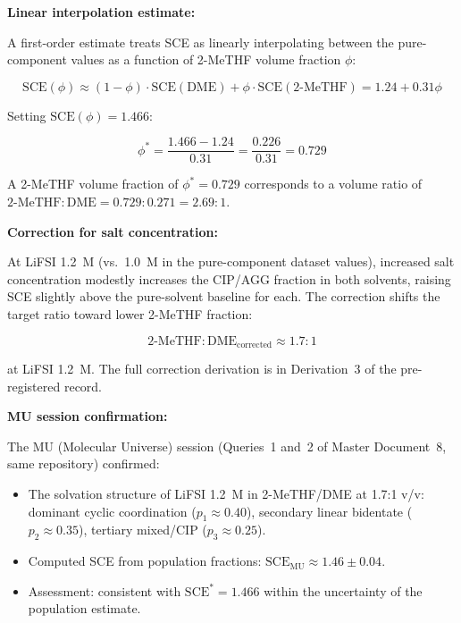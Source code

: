 \documentclass[11pt]{article}
\theoremstyle{plain}
\theoremstyle{definition}
\theoremstyle{remark}
\begin{document}
\textbf{Linear interpolation estimate:}

A first-order estimate treats SCE as linearly interpolating between
the pure-component values as a function of 2-MeTHF volume fraction
$\phi$:

\begin{equation}
  \mathrm{SCE}(\phi) \approx
  (1 - \phi) \cdot \mathrm{SCE}(\mathrm{DME}) +
  \phi \cdot \mathrm{SCE}(\mathrm{2\text{-}MeTHF})
  = 1.24 + 0.31\phi
  \label{eq:SCE_interpolation}
\end{equation}

Setting $\mathrm{SCE}(\phi) = 1.466$:

\begin{equation}
  \phi^{*} = \frac{1.466 - 1.24}{0.31} = \frac{0.226}{0.31} = 0.729
  \label{eq:phi_star}
\end{equation}

A 2-MeTHF volume fraction of $\phi^{*} = 0.729$ corresponds to a
volume ratio of $\mathrm{2\text{-}MeTHF}:\mathrm{DME} = 0.729:0.271
= 2.69:1$.

\textbf{Correction for salt concentration:}

At LiFSI 1.2~M (vs.\ 1.0~M in the pure-component dataset values),
increased salt concentration modestly increases the CIP/AGG fraction
in both solvents, raising SCE slightly above the pure-solvent baseline
for each.  The correction shifts the target ratio toward lower
2-MeTHF fraction:

\begin{equation}
  \mathrm{2\text{-}MeTHF}:\mathrm{DME}_{\mathrm{corrected}} \approx 1.7:1
  \label{eq:corrected_ratio}
\end{equation}

at LiFSI 1.2~M.  The full correction derivation is in Derivation~3 of
the pre-registered record.

\textbf{MU session confirmation:}

The MU (Molecular Universe) session (Queries~1 and~2 of Master
Document~8, same repository) confirmed:
\begin{itemize}[leftmargin=2em]
  \item The solvation structure of LiFSI 1.2~M in 2-MeTHF/DME at
        1.7:1 v/v: dominant cyclic coordination ($p_1 \approx 0.40$),
        secondary linear bidentate ($p_2 \approx 0.35$), tertiary
        mixed/CIP ($p_3 \approx 0.25$).
  \item Computed SCE from population fractions:
        $\mathrm{SCE}_{\mathrm{MU}} \approx 1.46 \pm 0.04$.
  \item Assessment: consistent with $\mathrm{SCE}^{*} = 1.466$ within
        the uncertainty of the population estimate.
\end{itemize}
\end{document}
